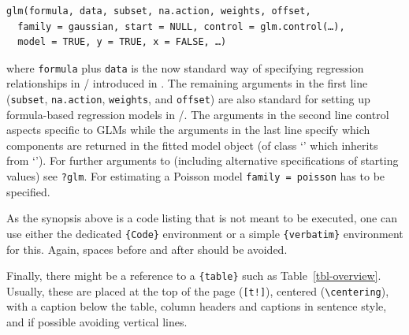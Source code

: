 \documentclass[
  nojss,
  article]{jss}
\newcommand{\class}[1]{`\code{#1}'}
\newcommand{\fct}[1]{\code{#1()}}
\begin{document}
\begin{verbatim}
glm(formula, data, subset, na.action, weights, offset,
  family = gaussian, start = NULL, control = glm.control(…),
  model = TRUE, y = TRUE, x = FALSE, …)
\end{verbatim}

where \texttt{formula} plus \texttt{data} is the now standard way of
specifying regression relationships in /
introduced in \citet{ChambersHastie1992}. The remaining arguments in the
first line (\texttt{subset}, \texttt{na.action}, \texttt{weights}, and
\texttt{offset}) are also standard for setting up formula-based
regression models in /. The arguments in the
second line control aspects specific to GLMs while the arguments in the
last line specify which components are returned in the fitted model
object (of class \class{glm} which inherits from \class{lm}). For
further arguments to \fct{glm} (including alternative specifications of
starting values) see \texttt{?glm}. For estimating a Poisson model
\texttt{family\ =\ poisson} has to be specified.

\begin{tcolorbox}[enhanced jigsaw, colframe=quarto-callout-color-frame, colback=white, rightrule=.15mm, toprule=.15mm, breakable, arc=.35mm, bottomrule=.15mm, leftrule=.75mm, left=2mm, opacityback=0]

As the synopsis above is a code listing that is not meant to be
executed, one can use either the dedicated \texttt{\{Code\}} environment
or a simple \texttt{\{verbatim\}} environment for this. Again, spaces
before and after should be avoided.

Finally, there might be a reference to a \texttt{\{table\}} such as
Table~\ref{tbl-overview}. Usually, these are placed at the top of the
page (\texttt{{[}t!{]}}), centered (\texttt{\textbackslash{}centering}),
with a caption below the table, column headers and captions in sentence
style, and if possible avoiding vertical lines.

\end{tcolorbox}
\end{document}
